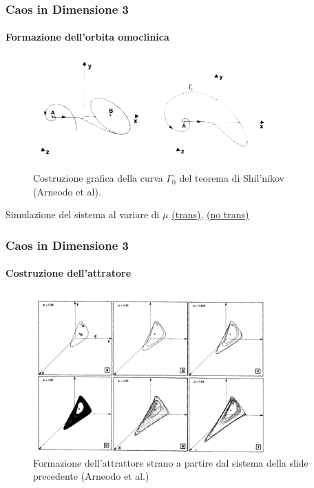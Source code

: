 \begin{frame}
\frametitle{Caos in Dimensione 3}
\framesubtitle{Formazione dell'orbita omoclinica}
\begin{figure}[H]
    \centering
    \includegraphics[width=0.4\textwidth]{figures/omo1.png}
    \includegraphics[width=0.4\textwidth]{figures/omo2.png}
    \caption{Costruzione grafica della curva $\Gamma_0$ del teorema di Shil'nikov (Arneodo et al). }
    \label{fig:figures-omo2-png}
\end{figure}
\begin{center}
Simulazione del sistema al variare di $\mu$ \textcolor{blue}{\href{run:link/Animated_trans.html}{(trans)}}, \textcolor{blue}{\href{run:link/Animated_no_trans.html}{(no trans)}}
\end{center}
\end{frame}

\begin{frame}
\frametitle{Caos in Dimensione 3}
\framesubtitle{Costruzione dell'attratore}
\begin{figure}[H]
    \centering
    \includegraphics[width=0.8\textwidth]{figures/Hopf.png}
    \caption{Formazione dell'attrattore strano a partire dal sistema della slide precedente (Arneodo et al.)}
    \label{fig:figures-Hopf-png}
\end{figure}
\end{frame}

